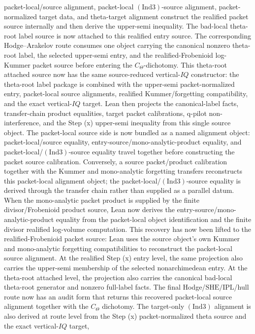 \documentclass[11pt]{article}
\newcommand{\Lean}{Lean}
\newcommand{\Ind}{\ensuremath{\mathrm{Ind}}}
\newcommand{\SHE}{\ensuremath{\mathrm{SHE}}}
\newcommand{\IPL}{\ensuremath{\mathrm{IPL}}}
\theoremstyle{plain}
\theoremstyle{definition}
\theoremstyle{remark}
\begin{document}
packet-local/source alignment, packet-local \((\Ind3)\)-source alignment,
packet-normalized target data, and theta-target alignment construct the
realified packet source internally and then derive the upper-semi inequality.
The bad-local theta-root label source is now attached to this realified entry
source.  The corresponding Hodge--Arakelov route consumes one object carrying
the canonical nonzero theta-root label, the selected upper-semi entry, and the
realified-Frobenioid log-Kummer packet source before entering the
\(C_\Theta\)-dichotomy.
This theta-root attached source now has the same source-reduced
vertical-\(IQ\) constructor: the theta-root label package is combined with the
upper-semi packet-normalized entry, packet-local source alignments, realified
Kummer/forgetting compatibility, and the exact vertical-\(IQ\) target.  \Lean{}
then projects the canonical-label facts, transfer-chain product equalities,
target packet calibrations, q-pilot non-interference, and the Step (x)
upper-semi inequality from this single source object.
The packet-local source side is now bundled as a named alignment object:
packet-local/source equality, entry-source/mono-analytic-product equality, and
packet-local/\((\Ind3)\)-source equality travel together before constructing
the packet source calibration.
Conversely, a source packet/product calibration together with the Kummer and
mono-analytic forgetting transfers reconstructs this packet-local alignment
object; the packet-local/\((\Ind3)\)-source equality is derived through the
transfer chain rather than supplied as a parallel datum.
When the mono-analytic packet product is supplied by the finite
divisor/Frobenioid product source, \Lean{} now derives the
entry-source/mono-analytic-product equality from the packet-local object
identification and the finite divisor realified log-volume computation.
This recovery has now been lifted to the realified-Frobenioid packet source:
\Lean{} uses the source object's own Kummer and mono-analytic forgetting
compatibilities to reconstruct the packet-local source alignment.
At the realified Step (x) entry level, the same projection also carries the
upper-semi membership of the selected nonarchimedean entry.
At the theta-root attached level, the projection also carries the canonical
bad-local theta-root generator and nonzero full-label facts.
The final Hodge/\(\SHE/\IPL\)/hull route now has an audit form that returns
this recovered packet-local source alignment together with the \(C_\Theta\)
dichotomy.
The target-only \((\Ind3)\) alignment is also derived at route level from the
Step (x) packet-normalized theta source and the exact vertical-\(IQ\) target,
\end{document}
